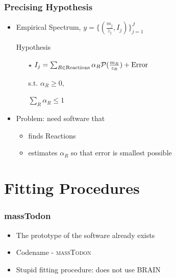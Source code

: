 \documentclass[xetex]{beamer}
\begin{document}
	\begin{frame}\frametitle{Precising Hypothesis} 
		\begin{itemize}
			\item Empirical Spectrum, $y = \Big\{ (\frac{m_j}{z_j}, I_j) \Big\}_{j = 1}^{J}$
			\item[] Hypothesis
			\begin{itemize}
				\item[$\star$] $I_j = \sum_{R \in \text{Reactions}} \alpha_R \mathcal{P}(\frac{m_R}{z_R}) + \text{Error}$
				\item[s.t.] $\alpha_R \geq 0,$ 
				\item[] $\sum_R \alpha_R \leq 1$
			\end{itemize}
			\item[]
			\item Problem: need software that
			\begin{itemize}
				\item finds Reactions 
				\item estimates $\alpha_R$ so that error is smallest possible
			\end{itemize}
		\end{itemize}
	\end{frame}

\section[Fitting]{Fitting Procedures}	


	\begin{frame}\frametitle{massTodon}
		\begin{itemize}
			\item The prototype of the software already exists
			\item Codename - \textsc{massTodon}
			\item Stupid fitting procedure: does not use BRAIN
		\end{itemize}
	\end{frame}
\end{document}
